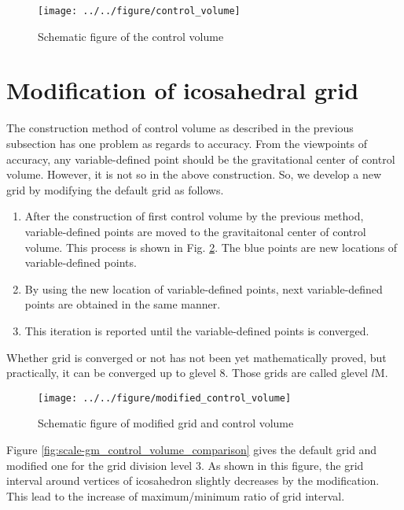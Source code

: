 \begin{figure}[H]
  \begin{center}
    \texttt{[image: ../../figure/control\_volume]}
    \caption{Schematic figure of the control volume}
    \label{fig:scale-gm_control_volume}
  \end{center}
\end{figure}


\section{Modification of icosahedral grid}
The construction method of control volume as described in the previous
subsection has one problem as regards to accuracy. From the viewpoints of
accuracy, any variable-defined point should be the gravitational center of
control volume. However, it is not so in the above construction. So, we
develop a new grid by modifying the default grid as follows.
\begin{enumerate}
  \item After the construction of first control volume by the previous method,
    variable-defined points are moved to the gravitaitonal center of control
    volume. This process is shown in Fig. \ref{fig:scale-gm_modified_control_volume}. The blue points are new
    locations of variable-defined points.
  \item By using the new location of variable-defined points, next
    variable-defined points are obtained in the same manner.
  \item This iteration is reported until the variable-defined points is
    converged.
\end{enumerate}
Whether grid is converged or not has not been yet mathematically proved, but
practically, it can be converged up to glevel 8. Those grids are called glevel
$l$M.

\begin{figure}[H]
  \begin{center}
    \texttt{[image: ../../figure/modified\_control\_volume]}
    \caption{Schematic figure of modified grid and control volume}
    \label{fig:scale-gm_modified_control_volume}
  \end{center}
\end{figure}


Figure \ref{fig:scale-gm_control_volume_comparison} gives the default grid and modified one for the grid division level
3. As shown in this figure, the grid interval around vertices of icosahedron
slightly decreases by the modification. This lead to the increase of
maximum/minimum ratio of grid interval. 

